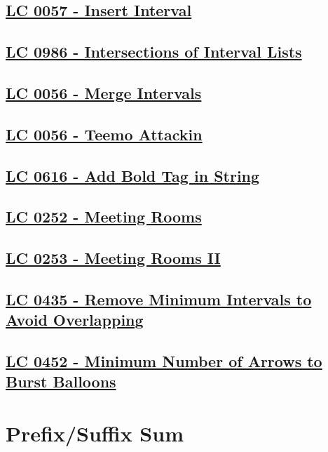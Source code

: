 \subsection{\hyperref[lc0057]{LC 0057 - Insert Interval}}
\subsection{\hyperref[lc0986]{LC 0986 - Intersections of Interval Lists}}
\subsection{\hyperref[lc0056]{LC 0056 - Merge Intervals}}
\subsection{\hyperref[lc0495]{LC 0056 - Teemo Attackin}}
\subsection{\hyperref[lc0616]{LC 0616 - Add Bold Tag in String}}
\subsection{\hyperref[lc0252]{LC 0252 - Meeting Rooms}}
\subsection{\hyperref[lc0253]{LC 0253 - Meeting Rooms II}}
\subsection{\hyperref[lc0435]{LC 0435 - Remove Minimum Intervals to Avoid Overlapping}}
\subsection{\hyperref[lc0452]{LC 0452 - Minimum Number of Arrows to Burst Balloons}}

\section{Prefix/Suffix Sum}\label{sec:prefix_sum}
